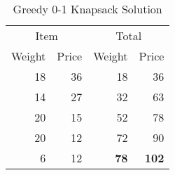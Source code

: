 \begin{table}[H]
\begin{center}
\begin{tabular}{rr||rr}
\multicolumn{2}{c||}{Item} & \multicolumn{2}{c}{Total} \\
\multicolumn{1}{c}{Weight} & \multicolumn{1}{c||}{Price} & \multicolumn{1}{c}{Weight} & \multicolumn{1}{c}{Price} \\
\hline
18 & 36 & 18 &  36 \\
14 & 27 & 32 &  63 \\
20 & 15 & 52 &  78 \\
20 & 12 & 72 &  90 \\
 6 & 12 & \textbf{78} & \textbf{102} \\
\end{tabular}
\end{center}
\caption{Greedy 0-1 Knapsack Solution}
\end{table}